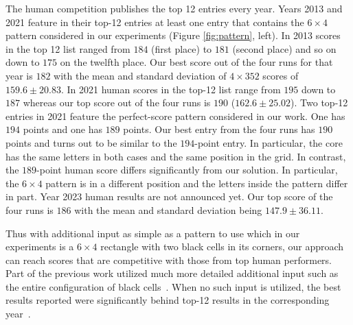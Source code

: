The human competition publishes the top 12 entries every year. Years 2013 and 2021 feature in their top-12 entries at least one entry that contains the $6 \times 4$ pattern considered in our experiments (Figure \ref{fig:pattern}, left). In 2013 scores in the top 12 list ranged from $184$ (first place) to $181$ (second place) and so on down to $175$ on the twelfth place. Our best score out of the four runs for that year is $182$  with the mean and standard deviation of $4 \times 352$ scores of $159.6  \pm 20.83$. In 2021 human scores in the top-12 list range from $195$ down to $187$ whereas our top score out of the four runs is $190$ ($162.6 \pm 25.02$). Two top-12 entries in 2021 feature the perfect-score pattern considered in our work. One has $194$ points and one has $189$ points. Our best entry from the four runs has $190$ points and turns out to be similar to the $194$-point entry. In particular, the core has the same letters in both cases and the same position in the grid. In contrast, the $189$-point human score differs significantly from our solution. In particular, the $6 \times 4$ pattern is in a different position and the letters inside the pattern differ in part. Year 2023 human results are not announced yet. Our top score of the four runs is $186$ with the mean and standard deviation being $147.9 \pm 36.11$.

Thus with additional input as simple as a pattern to use which in our experiments is a $6 \times 4$ rectangle with two black cells in its corners, our approach can reach scores that are competitive with those from top human performers. Part of the previous work utilized much more detailed additional input such as the entire configuration of black cells~\cite{DBLP:conf/socs/BoteaB21}. When no such input is utilized, the best results reported were significantly behind top-12 results in the corresponding
year~\cite{DBLP:conf/cig/BulitkoB21,Botea_Bulitko_2022}.




